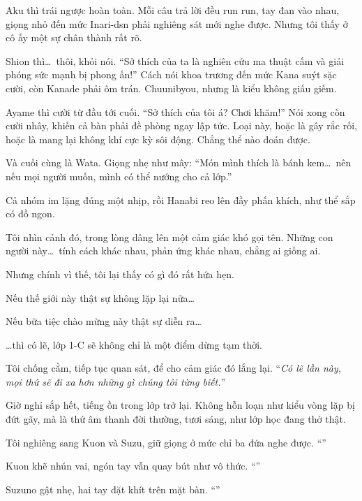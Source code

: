 \documentclass[../main.tex]{subfiles}
\begin{document}
Aku thì trái ngược hoàn toàn.
Mỗi câu trả lời đều run run, tay đan vào nhau, giọng nhỏ đến mức Inari-dsn phải nghiêng sát mới nghe được. Nhưng tôi thấy ở cô ấy một sự chân thành rất rõ.

Shion thì\dots\ thôi, khỏi nói. ``Sở thích của ta là nghiên cứu ma thuật cấm và giải phóng sức mạnh bị phong ấn!'' Cách nói khoa trương đến mức Kana suýt sặc cười, còn Kanade phải ôm trán. Chuunibyou, nhưng là kiểu không giấu giếm.

Ayame thì cười từ đầu tới cuối.
``Sở thích của tôi á? Chơi khăm!'' Nói xong còn cười nhây, khiến cả bàn phải đề phòng ngay lập tức. Loại này, hoặc là gây rắc rối, hoặc là mang lại không khí cực kỳ sôi động. Chẳng thể nào đoán được.

Và cuối cùng là Wata. Giọng nhẹ như mây: ``Món mình thích là bánh kem\dots\ nên nếu mọi người muốn, mình có thể nướng cho cả lớp.''

Cả nhóm im lặng đúng một nhịp, rồi Hanabi reo lên đầy phấn khích, như thể sắp có đồ ngon.

Tôi nhìn cảnh đó, trong lòng dâng lên một cảm giác khó gọi tên. Những con người này\dots\ tính cách khác nhau, phản ứng khác nhau, chẳng ai giống ai.

Nhưng chính vì thế, tôi lại thấy có gì đó rất hứa hẹn.

Nếu thế giới này thật sự không lặp lại nữa\dots

Nếu bữa tiệc chào mừng này thật sự diễn ra\dots

\dots thì có lẽ, lớp 1-C sẽ không chỉ là một điểm dừng tạm thời.

Tôi chống cằm, tiếp tục quan sát, để cho cảm giác đó lắng lại. ``\textit{Có lẽ lần này, mọi thứ sẽ đi xa hơn những gì chúng tôi từng biết.}''

Giờ nghỉ sắp hết, tiếng ồn trong lớp trở lại. Không hỗn loạn như kiểu vòng lặp bị đứt gãy, mà là thứ âm thanh đời thường, tươi sáng, như lớp học đang thở thật.

Tôi nghiêng sang Kuon và Suzu, giữ giọng ở mức chỉ ba đứa nghe được. ``''

Kuon khẽ nhún vai, ngón tay vẫn quay bút như vô thức. ``''

Suzuno gật nhẹ, hai tay đặt khít trên mặt bàn.
``''
\end{document}
